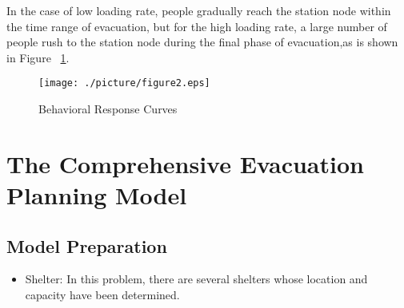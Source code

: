 \documentclass{mcmthesis}	%
\begin{document}
In the case of low loading rate, people gradually reach the station node within the time range of evacuation, but for the high loading rate, a large number of people rush to the station node during the final phase of evacuation,as is shown in Figure ~\ref{fig:2}.%

\begin{figure}[htbp]%
  \centering%
  \texttt{[image: ./picture/figure2.eps]}
  \caption{Behavioral Response Curves}\label{fig:2}%
 \end{figure}


\section{The Comprehensive Evacuation Planning Model}
\subsection{Model Preparation}

\begin{itemize}


\item Shelter: In this problem, there are several shelters whose location and capacity have been determined.
\end{itemize}
\end{document}
